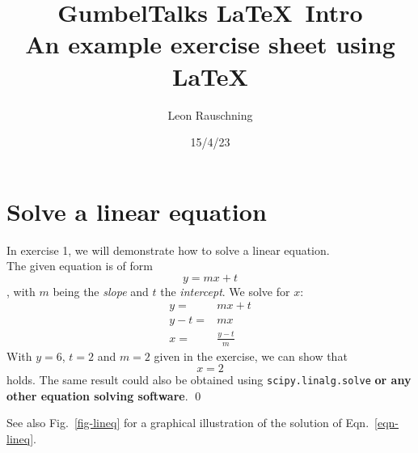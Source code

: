 \documentclass[11pt, a4paper]{article} %
\title{GumbelTalks \LaTeX\ Intro\\
\large An example exercise sheet using \LaTeX}
\author{Leon Rauschning}
\date{15/4/23} %
\begin{document}
\maketitle %
\section{Solve a linear equation}
In exercise 1, we will demonstrate how to solve a linear equation.\\ %
The given equation is of form
\begin{equation} %
	y = mx + t %
	\label{eqn-lineq} %
\end{equation}
, with $m$ being the \emph{slope} and $t$ the \emph{intercept}.
We solve for $x$:
\begin{eqnarray*} %
	y =& mx + t\\ %
	y - t =& mx\\ %
	x =& \frac{y-t}{m}
\end{eqnarray*}
With $y=6$, $t=2$ and $m=2$ given in the exercise, we can show that
$$x=2$$ %
holds.
The same result could also be obtained using \texttt{scipy.linalg.solve} \textbf{or any other equation solving software}. %
\qed

See also Fig.~\ref{fig-lineq} for a graphical illustration of the solution of Eqn.~\ref{eqn-lineq}. %
\end{document}
